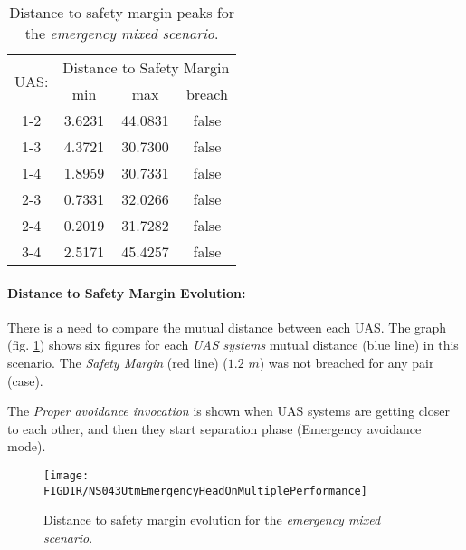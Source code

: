     \begin{table}[H]
        \centering
        \begin{tabular}{c||c|c|c}
            \multirow{2}{*}{UAS:} & \multicolumn{3}{c}{Distance to Safety Margin} \\ \cline{2-4} 
                      & min          & max         & breach         \\ \hline\hline
                1-2   & 3.6231       & 44.0831     & false          \\ \hline
                1-3   & 4.3721       & 30.7300     & false          \\ \hline
                1-4   & 1.8959       & 30.7331     & false          \\ \hline
                2-3   & 0.7331       & 32.0266     & false          \\ \hline
                2-4   & 0.2019       & 31.7282     & false          \\ \hline
                3-4   & 2.5171       & 45.4257     & false          \\ 
        \end{tabular}
        \caption{Distance to safety margin peaks for the \emph{emergency mixed scenario}.}
        \label{tab:testCaseEmergencyMixedSafetyMarginDistances}
    \end{table}
      
    \paragraph{Distance to Safety Margin Evolution:} There is a need to compare the mutual distance between each UAS. The graph (fig. \ref{fig:testCaseMultipleAvoidancePerformance}) shows six figures for each \emph{UAS systems} mutual distance (blue line) in this scenario. The \emph{Safety Margin} (red line) ($1.2$ $m$) was not breached for any pair (case). 
    
    The \emph{Proper avoidance invocation} is shown when UAS systems are getting closer to each other, and then they start separation phase (Emergency avoidance mode).
            
    \begin{figure}[H]
        \centering
        \texttt{[image: \\FIGDIR/NS043UtmEmergencyHeadOnMultiplePerformance]} 
        \caption{Distance to safety margin evolution for the  \emph{emergency mixed scenario}.}
        \label{fig:testCaseMultipleAvoidancePerformance}
    \end{figure}
   

